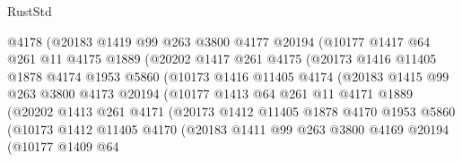 \begin{lexlean}{RustStd}
\begin{coremodule}
{\begin{coremodule}
{{{{{{{{{{{{{{{{{{{{{{{{{{{{{                    @4178
                    (@20183
                      @1419
                      @99
                      @263
                      @3800
                      @4177
                      @20194
                      (@10177
                        @1417
                        @64
                        @261
                        @11
                        @4175
                        @1889
                        (@20202
                          @1417
                          @261
                          @4175
                          (@20173
                            @1416
                            @11405
                            @1878
                            @4174
                            @1953
                            @5860
                            (@10173
                              @1416
                              @11405
                              @4174
                              (@20183
                                @1415
                                @99
                                @263
                                @3800
                                @4173
                                @20194
                                (@10177
                                  @1413
                                  @64
                                  @261
                                  @11
                                  @4171
                                  @1889
                                  (@20202
                                    @1413
                                    @261
                                    @4171
                                    (@20173
                                      @1412
                                      @11405
                                      @1878
                                      @4170
                                      @1953
                                      @5860
                                      (@10173
                                        @1412
                                        @11405
                                        @4170
                                        (@20183
                                          @1411
                                          @99
                                          @263
                                          @3800
                                          @4169
                                          @20194
                                          (@10177
                                            @1409
                                            @64
}}}}}}}}}}}}}}}}}}}}}}}}}}}}}
\end{coremodule}}
\end{coremodule}
\end{lexlean}
